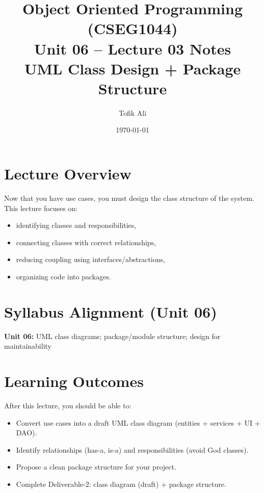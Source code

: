 \documentclass[11pt]{article}
\title{Object Oriented Programming (CSEG1044)\\Unit 06 -- Lecture 03 Notes\\UML Class Design + Package Structure}
\author{Tofik Ali}
\date{\today}
\begin{document}
\maketitle
\tableofcontents

\section{Lecture Overview}
Now that you have use cases, you must design the class structure of the system.
This lecture focuses on:
\begin{itemize}
  \item identifying classes and responsibilities,
  \item connecting classes with correct relationships,
  \item reducing coupling using interfaces/abstractions,
  \item organizing code into packages.
\end{itemize}
\notesources{\OOPSUnitVISources}

\section{Syllabus Alignment (Unit 06)}
\textbf{Unit 06:} UML class diagrams; package/module structure; design for maintainability

\section{Learning Outcomes}
After this lecture, you should be able to:
\begin{itemize}
  \item Convert use cases into a draft UML class diagram (entities + services + UI + DAO).
  \item Identify relationships (has-a, is-a) and responsibilities (avoid God classes).
  \item Propose a clean package structure for your project.
  \item Complete Deliverable-2: class diagram (draft) + package structure.
\end{itemize}
\end{document}
